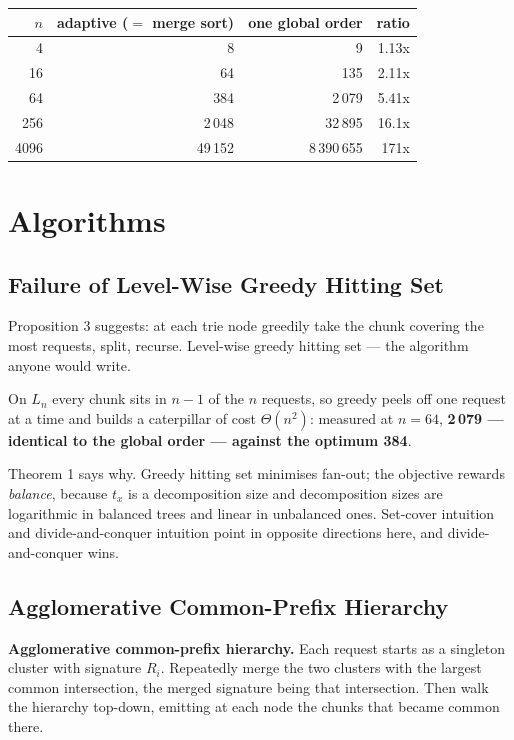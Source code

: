 \documentclass[11pt]{article}
\theoremstyle{plain}
\begin{document}
\begin{center}\small
\begin{tabular}{rrrr}\toprule
$n$ & adaptive ($=$ merge sort) & one global order & ratio \\ \midrule
4 & 8 & 9 & 1.13x \\
16 & 64 & 135 & 2.11x \\
64 & 384 & 2\,079 & 5.41x \\
256 & 2\,048 & 32\,895 & 16.1x \\
4096 & 49\,152 & 8\,390\,655 & 171x \\
\bottomrule\end{tabular}\end{center}


\section{Algorithms}

\subsection{Failure of Level-Wise Greedy Hitting Set}

Proposition 3 suggests: at each trie node greedily take the chunk covering the most requests, split, recurse. Level-wise greedy hitting set --- the algorithm anyone would write.

On $L_n$ every chunk sits in $n-1$ of the $n$ requests, so greedy peels off one request at a time and builds a caterpillar of cost $\Theta(n^2)$: measured at $n = 64$, \textbf{2\,079 --- identical to the global order --- against the optimum 384}.

Theorem 1 says why. Greedy hitting set minimises fan-out; the objective rewards \emph{balance}, because $t_x$ is a decomposition size and decomposition sizes are logarithmic in balanced trees and linear in unbalanced ones. Set-cover intuition and divide-and-conquer intuition point in opposite directions here, and divide-and-conquer wins.

\subsection{Agglomerative Common-Prefix Hierarchy}

\textbf{Agglomerative common-prefix hierarchy.} Each request starts as a singleton cluster with signature $R_i$. Repeatedly merge the two clusters with the largest common intersection, the merged signature being that intersection. Then walk the hierarchy top-down, emitting at each node the chunks that became common there.
\end{document}
